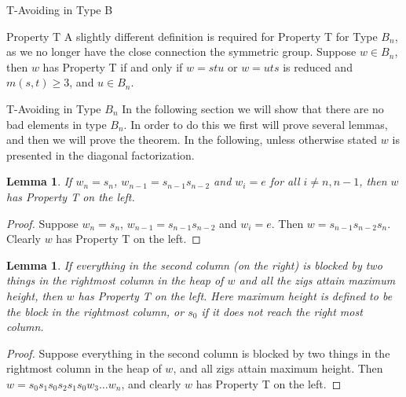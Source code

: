 \documentclass[11pt]{amsart}
\newtheorem{lemma}[theorem]{Lemma}
\theoremstyle{definition}
\numberwithin{equation}{section}
\renewcommand{\(}{\left(}
\renewcommand{\)}{\right)}
\begin{document}
\begin{section}{T-Avoiding in Type B}
\begin{subsection}{Property T}
A slightly different definition is required for Property T for Type $B_n$, as we no longer have the close connection the symmetric group. Suppose $w \in B_n$, then $w$ has Property T if and only if $w=stu$ or $w=uts$ is reduced and $m(s,t) \geq 3$, and $u \in B_n$. 	
\end{subsection}


\begin{subsection}{T-Avoiding in Type $B_n$}
In the following section we will show that there are no bad elements in type $B_n$. In order to do this we first will prove several lemmas, and then we will prove the theorem. In the following, unless otherwise stated $w$ is presented in the diagonal factorization.
\begin{lemma}
If $w_n=s_n$, $w_{n-1}=s_{n-1}s_{n-2}$ and $w_i=e$ for all $i \neq n, n-1$, then $w$ has Property T on the left.	
\end{lemma}
\begin{proof}	
Suppose $w_n=s_n$, $w_{n-1}=s_{n-1}s_{n-2}$ and $w_i=e$. Then $w=s_{n-1}s_{n-2}s_n$. Clearly $w$ has Property T on the left.
\end{proof}

\begin{lemma}
If everything in the second column (on the right) is blocked by two things in the rightmost column in the heap of $w$ and all the zigs attain maximum height, then $w$ has Property T on the left.	Here maximum height is defined to be the block in the rightmost column, or $s_0$ if it does not reach the right most column.
\end{lemma}
\begin{proof}
Suppose everything in the second column is blocked by two things in the rightmost column in the heap of $w$, and all zigs attain maximum height. Then $w=s_0s_1s_0s_2s_1s_0w_3 \ldots w_n$, and clearly $w$ has Property T on the left.	
\end{proof}


\end{subsection}
\end{section}
\end{document}
